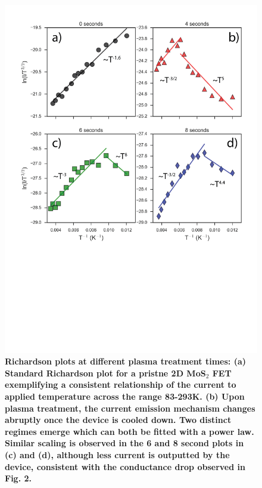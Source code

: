 \documentclass[%
 aip,
 jmp,%
 amsmath,amssymb,
 reprint,%
]{revtex4-1}
\begin{document}
{\setlength\intextsep{5pt}
\begin{figure}
\centering
\includegraphics[width=\columnwidth]{Figure_4.png}
\caption{{\footnotesize \textbf{Richardson plots at different plasma treatment times: (a) Standard Richardson plot for a pristne 2D MoS$_2$ FET exemplifying a consistent relationship of the current to applied temperature across the range 83-293K. (b) Upon plasma treatment, the current emission mechanism changes abruptly once the device is cooled down. Two distinct regimes emerge which can both be fitted with a power law. Similar scaling is observed in the 6 and 8 second plots in (c) and (d), although less current is outputted by the device, consistent with the conductance drop observed in \textbf{Fig. 2}.  }}}
\label{fig:electrical}
\end{figure}}
\end{document}
